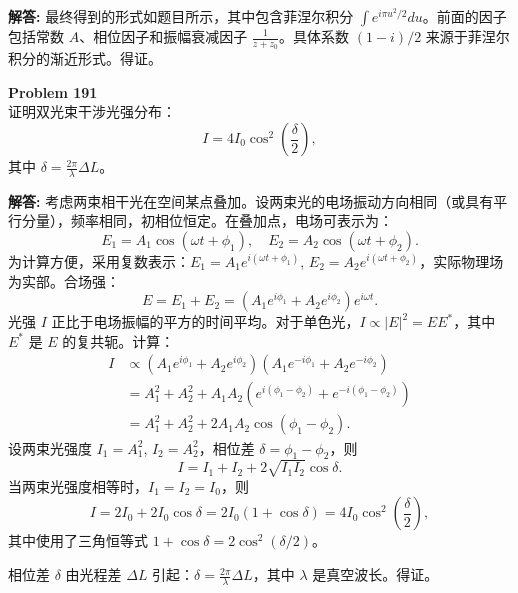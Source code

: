 \documentclass[12pt, a4paper, oneside]{ctexart}
\newenvironment{solution}{\par\noindent\textbf{解答:}\quad}{\par}
\begin{document}
\begin{solution}
    最终得到的形式如题目所示，其中包含菲涅尔积分 $\int e^{i \pi u^2/2} du$。前面的因子包括常数 $A$、相位因子和振幅衰减因子 $\frac{1}{z+z_0}$。具体系数 $(1-i)/2$ 来源于菲涅尔积分的渐近形式。得证。
\end{solution}
\begin{mdframed}[backgroundcolor=gray!10, linewidth=0pt]
    \textbf{Problem 191} \\
    证明双光束干涉光强分布：
    \[
    I = 4 I_0 \cos^2 \left( \frac{\delta}{2} \right),
    \]
    其中 $\delta = \frac{2\pi}{\lambda} \Delta L$。
\end{mdframed}
\begin{solution}
    考虑两束相干光在空间某点叠加。设两束光的电场振动方向相同（或具有平行分量），频率相同，初相位恒定。在叠加点，电场可表示为：
    \[
    E_1 = A_1 \cos(\omega t + \phi_1), \quad E_2 = A_2 \cos(\omega t + \phi_2).
    \]
    为计算方便，采用复数表示：$E_1 = A_1 e^{i(\omega t + \phi_1)}$, $E_2 = A_2 e^{i(\omega t + \phi_2)}$，实际物理场为实部。合场强：
    \[
    E = E_1 + E_2 = (A_1 e^{i\phi_1} + A_2 e^{i\phi_2}) e^{i\omega t}.
    \]
    光强 $I$ 正比于电场振幅的平方的时间平均。对于单色光，$I \propto |E|^2 = E E^*$，其中 $E^*$ 是 $E$ 的复共轭。计算：
    \begin{align*}
        I &\propto (A_1 e^{i\phi_1} + A_2 e^{i\phi_2})(A_1 e^{-i\phi_1} + A_2 e^{-i\phi_2}) \\
        &= A_1^2 + A_2^2 + A_1 A_2 (e^{i(\phi_1-\phi_2)} + e^{-i(\phi_1-\phi_2)}) \\
        &= A_1^2 + A_2^2 + 2 A_1 A_2 \cos(\phi_1 - \phi_2).
    \end{align*}
    设两束光强度 $I_1 = A_1^2$, $I_2 = A_2^2$，相位差 $\delta = \phi_1 - \phi_2$，则
    \[
    I = I_1 + I_2 + 2\sqrt{I_1 I_2} \cos \delta.
    \]
    当两束光强度相等时，$I_1 = I_2 = I_0$，则
    \[
    I = 2I_0 + 2I_0 \cos\delta = 2I_0 (1 + \cos\delta) = 4I_0 \cos^2\left(\frac{\delta}{2}\right),
    \]
    其中使用了三角恒等式 $1+\cos\delta = 2\cos^2(\delta/2)$。

    相位差 $\delta$ 由光程差 $\Delta L$ 引起：$\delta = \frac{2\pi}{\lambda} \Delta L$，其中 $\lambda$ 是真空波长。得证。
\end{solution}
\end{document}
